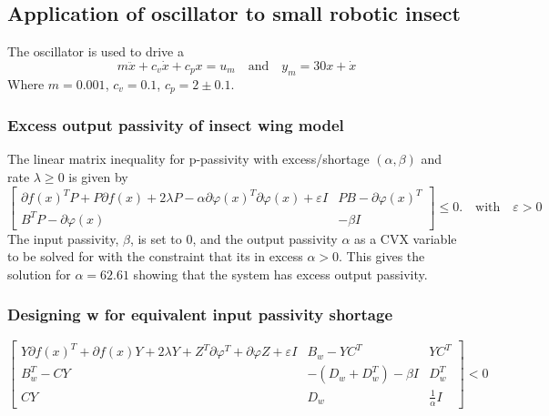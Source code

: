 \documentclass{article}
\begin{document}
\subsection{Application of oscillator to small robotic insect}

The oscillator is used to drive a 
\begin{equation}
    m\ddot{x} + c_v \dot{x} + c_p x = u_m \quad \text{and} \quad y_m = 30x + \dot{x}
\end{equation}
Where $m = 0.001$, $c_v = 0.1$, $c_p = 2 \pm 0.1$.

\subsubsection{Excess output passivity of insect wing model}

The linear matrix inequality for p-passivity with excess/shortage $(\alpha, \beta)$ and rate $\lambda \geq0$ is given by
\begin{equation}
    \left[
    \begin{array}{cc}
    \partial f(x)^T P + P \partial f(x) + 2 \lambda P - \alpha \partial \varphi(x)^T \partial \varphi(x) + \varepsilon I & P B - \partial \varphi(x)^T \\
    B^T P - \partial \varphi(x) & -\beta I
    \end{array}
    \right] \leq 0. \quad \text{with} \quad \varepsilon > 0
\end{equation}
The input passivity, $\beta$, is set to 0, and the output passivity $\alpha$ as a CVX variable to be solved for with the constraint that its in excess $\alpha > 0$.
This gives the solution for $\alpha = 62.61$ showing that the system has excess output passivity.

\subsubsection{Designing w for equivalent input passivity shortage}

\begin{equation}
\left[
\begin{array}{ccc}
Y \partial f(x)^T + \partial f(x) Y + 2\lambda Y + Z^T \partial \varphi^T + \partial \varphi Z + \varepsilon I & B_w - Y C^T & Y C^T \\
B_w^T - C Y & -(D_w + D_w^T) - \beta I & D_w^T \\
C Y & D_w & \frac{1}{\alpha} I
\end{array}
\right] < 0 \label{eq:mega_lmi}
\end{equation}
\end{document}
